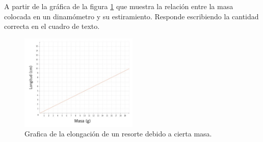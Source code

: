 A partir de la gráfica de la figura \ref{fig:SINMAT1_U3_AC75_IMG1} que muestra la relación entre la masa colocada en un dinamómetro y su estiramiento. Responde escribiendo la cantidad correcta en el cuadro de texto.

\begin{multicols}{2}
    \begin{figure}[H]
        \centering
        \includegraphics[width=0.5\textwidth]{../images/SINMAT1_U3_AC75_IMG1.jpg}
        \caption{Grafica de la elongación de un resorte debido a cierta masa.}
        \label{fig:SINMAT1_U3_AC75_IMG1}
    \end{figure}
    \begin{parts}
        
        
        
        
        
    \end{parts}
\end{multicols}
